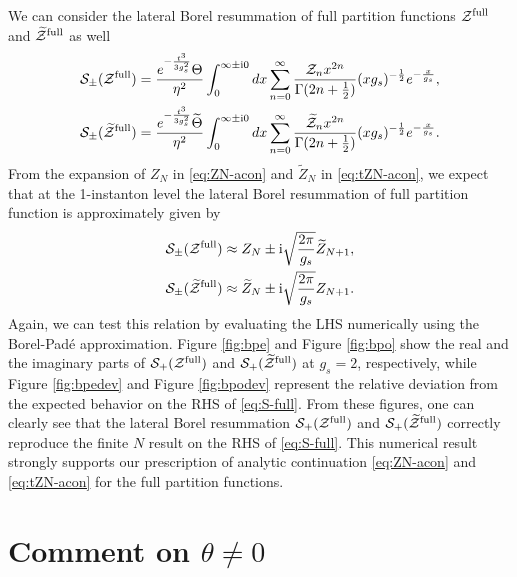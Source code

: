 \documentclass[11pt]{article}
\newcommand{\ri}{{\rm i}}
\def\th{\theta}
\newcommand{\hf}{\frac{1}{2}}
\def\til#1{\widetilde{#1}}
\def\Ga{\Gamma}
\def\rt#1{\sqrt{#1}}
\renewcommand{\[}{\begin{eqnarray}}
\renewcommand{\]}{\end{eqnarray}}
\newcommand{\Zefull}{{\cal Z}^{\text{full}}}
\newcommand{\Zofull}{{\widetilde{\cal Z}}^{\text{full}}}
\newcommand{\Zeven}{{\cal Z}}
\newcommand{\Zodd}{{\widetilde{\cal Z}}}
\newcommand{\Thetaeven}{\Theta}
\newcommand{\Thetaodd}{{\widetilde{\Theta}}}
\begin{document}
We can consider the lateral Borel resummation of 
full partition functions $\Zefull$ and $\Zofull$ as well
\begin{align}
 \begin{aligned}
  \mathcal{S}_{\pm}(\Zefull)&=\frac{e^{-\frac{t^3}{3g_s^2}}\Thetaeven}{\eta^2}\int_0^{\infty\pm\ri 0}
dx \sum_{n=0}^\infty \frac{\Zeven_n x^{2n}}{\Ga(2n+\hf)}(xg_s)^{-\hf} e^{-\frac{x}{g_s}},
\\
\mathcal{S}_{\pm}(\Zofull)&=
\frac{e^{-\frac{t^3}{3g_s^2}}\Thetaodd}{\eta^2}\int_0^{\infty\pm\ri 0}
dx \sum_{n=0}^\infty \frac{\Zodd_n x^{2n}}{\Ga(2n+\hf)}(xg_s)^{-\hf} e^{-\frac{x}{g_s}}.
 \end{aligned}
\end{align}
From the 
expansion of $Z_N$ in \eqref{eq:ZN-acon} and $\til{Z}_N$ in \eqref{eq:tZN-acon},
we expect that at the 1-instanton level
the lateral Borel resummation of full partition function
is approximately given by
\begin{align}
\begin{aligned}
 \mathcal{S}_{\pm}(\Zefull)&\approx Z_N\pm\ri\rt{\frac{2\pi}{g_s}}\til{Z}_{N+1},\\
\mathcal{S}_{\pm}(\Zofull)&\approx\til{Z}_N\pm\ri\rt{\frac{2\pi}{g_s}}Z_{N+1}.
\end{aligned} 
\label{eq:S-full}
\end{align}
%
Again, we can test this relation by evaluating the LHS numerically 
using the Borel-Pad\'{e} approximation. Figure \ref{fig:bpe} and
Figure \ref{fig:bpo}
show the real and the imaginary parts of $\mathcal{S}_+(\Zefull)$
and $\mathcal{S}_+(\Zofull)$ at $g_s=2$, respectively, while Figure \ref{fig:bpedev} and 
Figure \ref{fig:bpodev}
represent the relative deviation from the expected behavior 
on the RHS of \eqref{eq:S-full}.
From these figures, one can clearly see that 
the lateral Borel resummation $\mathcal{S}_+(\Zefull)$
and $\mathcal{S}_+(\Zofull)$ correctly reproduce the finite $N$
result on the RHS of \eqref{eq:S-full}.
This numerical result strongly supports our prescription 
of analytic continuation \eqref{eq:ZN-acon} and \eqref{eq:tZN-acon}
for the full partition functions.



\section{Comment on $\th\ne0$ \label{sec:theta}}
\end{document}
